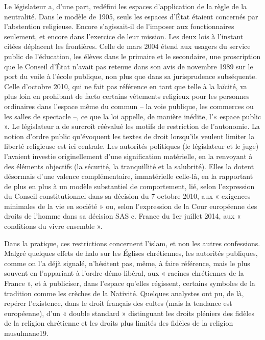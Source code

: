 Le législateur a, d’une part, redéfini les espaces d’application de la règle de la neutralité. Dans le modèle de 1905, seuls les espaces d’État étaient concernés par l’abstention religieuse. Encore s’agissait-il de l’imposer aux fonctionnaires seulement, et encore dans l’exercice de leur mission. Les deux lois à l’instant citées déplacent les frontières. Celle de mars 2004 étend aux usagers du service public de l’éducation, les élèves
dans le primaire et le secondaire, une proscription que le Conseil d’État n’avait pas retenue dans son avis de novembre 1989 sur le port du voile à l’école publique, non plus que dans sa jurisprudence subséquente. Celle d’octobre 2010, qui ne fait pas référence en tant que telle à la laïcité, va plus loin en prohibant de facto certains vêtements religieux pour les personnes ordinaires dans l’espace même du commun – la voie publique, les commerces ou les salles de spectacle –, ce que la loi appelle, de manière inédite, l’« espace public ». Le législateur a de surcroît réévalué les motifs de restriction de l’autonomie. La notion d’ordre public qu’évoquent les textes de droit lorsqu’ils veulent limiter la liberté religieuse est ici centrale. Les autorités politiques (le législateur et le juge) l’avaient investie originellement d’une signification matérielle, en la renvoyant à des éléments objectifs (la sécurité, la tranquillité et la salubrité). Elles la dotent désormais d’une valence complémentaire, immatérielle celle-là, en la rapportant de plus en plus à un modèle substantiel de comportement, lié, selon l’expression du Conseil constitutionnel dans sa décision du 7 octobre 2010, aux « exigences minimales de la vie en société » ou, selon l’expression de la Cour européenne des droits de l’homme dans sa décision SAS c. France du 1er juillet 2014, aux « conditions du vivre ensemble ».

Dans la pratique, ces restrictions concernent l’islam, et non les autres confessions. Malgré quelques effets de halo sur les Églises chrétiennes, les autorités publiques, comme on l’a déjà signalé, n’hésitent pas, même, à faire référence, mais le plus souvent en l’appariant à l’ordre démo-libéral, aux « racines chrétiennes de la France », et à publiciser, dans l’espace qu’elles régissent, certains symboles de la tradition comme les crèches de la Nativité. Quelques analystes ont pu, de là, repérer l’existence, dans le droit français des cultes (mais la tendance est européenne), d’un « double standard » distinguant les droits pléniers des fidèles de la religion chrétienne et les droits plus limités des fidèles de la religion musulmane19.

